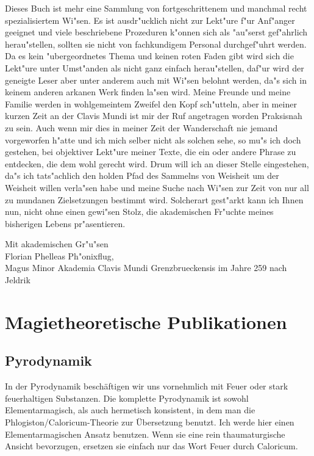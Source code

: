 \documentclass[a5paper,8pt]{book}
\begin{document}
Dieses Buch ist mehr eine Sammlung von fortgeschrittenem und manchmal recht spezialisiertem Wi"sen. Es ist ausdr"ucklich nicht zur Lekt"ure f"ur Anf"anger geeignet und viele beschriebene Prozeduren k"onnen sich als "au"serst gef"ahrlich herau"stellen, sollten sie nicht von fachkundigem Personal durchgef"uhrt werden.
Da es kein "ubergeordnetes Thema und keinen roten Faden gibt wird sich die Lekt"ure unter Umst"anden als nicht ganz einfach herau"stellen, daf"ur wird der geneigte Leser aber unter anderem auch mit Wi"sen belohnt werden, da"s sich in keinem anderen arkanen Werk finden la"sen wird.
Meine Freunde und meine Familie werden in wohlgemeintem Zweifel den Kopf sch"utteln, aber in meiner kurzen Zeit an der Clavis Mundi ist mir der Ruf angetragen worden Praksisnah zu sein. Auch wenn mir dies in meiner Zeit der Wanderschaft nie jemand vorgeworfen h"atte und ich mich selber nicht als solchen sehe, so mu"s ich doch gestehen, bei objektiver Lekt"ure meiner Texte, die ein oder andere Phrase zu entdecken, die dem wohl gerecht wird. Drum will ich an dieser Stelle eingestehen, da"s ich tats"achlich den holden Pfad des Sammelns von Weisheit um der Weisheit willen verla"sen habe und meine Suche nach Wi"sen zur Zeit von nur all zu  mundanen Zielsetzungen bestimmt wird.
Solcherart gest"arkt kann ich Ihnen nun, nicht ohne einen gewi"sen Stolz, die akademischen Fr"uchte meines bisherigen Lebens pr"asentieren.

Mit akademischen Gr"u"sen \\

Florian Phelleas Ph"onixflug, \\
Magus Minor Akademia Clavis Mundi Grenzbrueckensis im Jahre 259 nach Jeldrik \\


\tableofcontents



\chapter{ Magietheoretische Publikationen}

\section{Pyrodynamik}


In der Pyrodynamik beschäftigen wir uns vornehmlich mit Feuer oder stark feuerhaltigen Substanzen. Die komplette Pyrodynamik ist sowohl Elementarmagisch, als auch hermetisch konsistent, in dem man die Phlogiston/Caloricum-Theorie zur Übersetzung benutzt. Ich werde hier einen Elementarmagischen Ansatz benutzen. Wenn sie eine rein thaumaturgische Ansicht bevorzugen, ersetzen sie einfach nur das Wort Feuer durch Caloricum.
\end{document}
